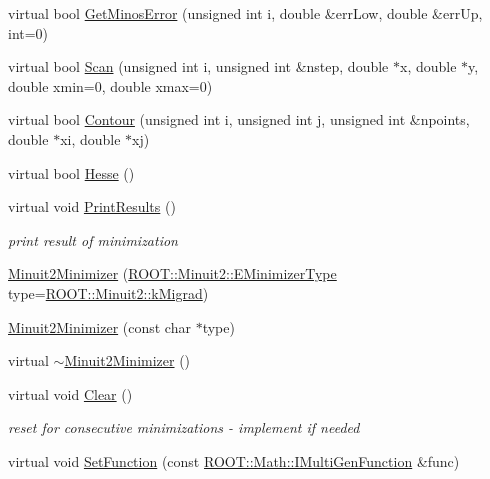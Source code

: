 \begin{DoxyCompactItemize}
virtual bool \mbox{\hyperlink{classROOT_1_1Minuit2_1_1Minuit2Minimizer_ab6c27c6f165821774dd304561e8956f5}{Get\+Minos\+Error}} (unsigned int i, double \&err\+Low, double \&err\+Up, int=0)
\item 
virtual bool \mbox{\hyperlink{classROOT_1_1Minuit2_1_1Minuit2Minimizer_a3f2f94c743a9b120a71da5ba23bd88cb}{Scan}} (unsigned int i, unsigned int \&nstep, double $\ast$x, double $\ast$y, double xmin=0, double xmax=0)
\item 
virtual bool \mbox{\hyperlink{classROOT_1_1Minuit2_1_1Minuit2Minimizer_a026780c27dd4b179817f826f49e36c8e}{Contour}} (unsigned int i, unsigned int j, unsigned int \&npoints, double $\ast$xi, double $\ast$xj)
\item 
virtual bool \mbox{\hyperlink{classROOT_1_1Minuit2_1_1Minuit2Minimizer_a0cfd04fde73c157de423705625ede51c}{Hesse}} ()
\item 
virtual void \mbox{\hyperlink{classROOT_1_1Minuit2_1_1Minuit2Minimizer_a0caadc2005eac5d87fc7345bd54decf0}{Print\+Results}} ()
\begin{DoxyCompactList}\small\item\em print result of minimization \end{DoxyCompactList}\item 
\mbox{\hyperlink{classROOT_1_1Minuit2_1_1Minuit2Minimizer_a0b75191bcd9e23e8dd5fbe6629c01704}{Minuit2\+Minimizer}} (\mbox{\hyperlink{namespaceROOT_1_1Minuit2_abdfae3dff24b1dc5a23955c06fe2a8d6}{R\+O\+O\+T\+::\+Minuit2\+::\+E\+Minimizer\+Type}} type=\mbox{\hyperlink{namespaceROOT_1_1Minuit2_abdfae3dff24b1dc5a23955c06fe2a8d6ad4b108176192edd930579158f0467e8f}{R\+O\+O\+T\+::\+Minuit2\+::k\+Migrad}})
\item 
\mbox{\hyperlink{classROOT_1_1Minuit2_1_1Minuit2Minimizer_aab2c36bd9eb8229d205b00d9573f550d}{Minuit2\+Minimizer}} (const char $\ast$type)
\item 
virtual \mbox{\hyperlink{classROOT_1_1Minuit2_1_1Minuit2Minimizer_ac46ec7e45b826edeeee858208bf9b01f}{$\sim$\+Minuit2\+Minimizer}} ()
\item 
virtual void \mbox{\hyperlink{classROOT_1_1Minuit2_1_1Minuit2Minimizer_a11e6ce9a4285080548f9855b78ca83b4}{Clear}} ()
\begin{DoxyCompactList}\small\item\em reset for consecutive minimizations -\/ implement if needed \end{DoxyCompactList}\item 
virtual void \mbox{\hyperlink{classROOT_1_1Minuit2_1_1Minuit2Minimizer_ae18efc66a943fe11b1114ff8c1b28ad0}{Set\+Function}} (const \mbox{\hyperlink{namespaceROOT_1_1Math_aec22897f3d759f7c284893c81d980799}{R\+O\+O\+T\+::\+Math\+::\+I\+Multi\+Gen\+Function}} \&func)

\end{DoxyCompactItemize}
